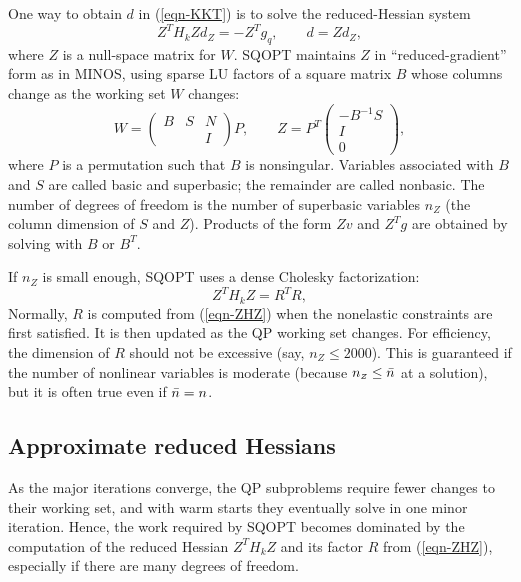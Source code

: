 \documentclass[draft,leqno,onefignum,onetabnum]{siamltex}
\def\nbar{\skew2\bar n}
\def\T{^T\!}
\def\inv{^{-1}}
\def\Z{_{\scriptscriptstyle Z}}
\def\MINOS {{\small MINOS}}
\def\SQOPT {{\small SQOPT}}
\newcommand{\pmat}[1]{\begin{pmatrix}#1\end{pmatrix}}
\begin{document}
One way to obtain $d$ in (\ref{eqn-KKT})
is to solve the reduced-Hessian system
\begin{equation} \label{eqn-ZHZsystem}
   Z\T H_k Z d\Z = - Z\T g_q, \qquad d = Z d\Z,
\end{equation}
where $Z$ is a null-space matrix for $W$.
\SQOPT{} maintains $Z$ in ``reduced-gradient'' form as in \MINOS, using
sparse LU factors of a square matrix $B$ whose columns change as the
working set $W$ changes:
\begin{equation}    \label{eqn-WBS}
   W = \pmat{B & S & N \\ & & I} P, \qquad
   Z = P^T \pmat{-B\inv S \\ I \\ 0},
\end{equation}
where $P$ is a permutation such that $B$ is nonsingular.
Variables associated with $B$ and $S$ are called basic and superbasic;
the remainder are called nonbasic.  The number of degrees of freedom
is the number of superbasic variables $n\Z$
(the column dimension of $S$ and $Z$).
Products of the form $Zv$ and $Z\T g$ are obtained by solving with
$B$ or $B\T$.

If $n\Z$ is small enough, \SQOPT{} uses a dense Cholesky factorization:
\begin{equation} \label{eqn-ZHZ}
   Z\T H_k Z = R\T R,
\end{equation}
Normally, $R$ is computed from (\ref{eqn-ZHZ})
when the nonelastic constraints are first satisfied. It
is then updated as the QP working set changes.  For efficiency, the
dimension of $R$ should not be excessive (say, $n\Z \le 2000$).  This
is guaranteed if the number of nonlinear variables is moderate
(because $n\Z \le \nbar$ at a solution), but it is often true
even if $\nbar = n$.




\subsection{Approximate reduced Hessians}   \label{sec-QN}

As the major iterations converge, the QP subproblems require fewer
changes to their working set, and with warm starts they eventually
solve in one minor iteration.  Hence, the work required by \SQOPT{}
becomes dominated by the computation of the reduced Hessian $Z\T H_k Z$
and its factor $R$ from (\ref{eqn-ZHZ}), especially if there are
many degrees of freedom.
\end{document}
